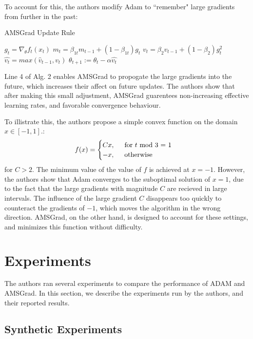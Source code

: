 \documentclass[letterpaper, 10 pt, conference]{ieeeconf}  %
\begin{document}
To account for this, the authors modify Adam to ``remember" large gradients from further in the past:

\begin{algorithm}
\caption{AMSGrad Update Rule}\label{Adam-update}
\begin{algorithmic}[1]
\State $g_t = \nabla_{\theta}f_t(x_t)$
\State $m_t = \beta_{1t}m_{t-1} + (1 - \beta_{1t})g_t$ 
\State $v_t = \beta_2{v_{t-1}} + (1-\beta_2)g_t^2$
\State $\hat{v_t} = max(\hat{v}_{t-1}, v_t)$
\State $\theta_{t + 1} := \theta_t - \alpha{\hat{v_t}}$
\end{algorithmic}
\end{algorithm}

Line 4 of Alg. 2 enables AMSGrad to propogate the large gradients into the future, which increases their affect on future updates. The authors show that after making this small adjustment, AMSGrad guarentees non-increasing effective learning rates, and favorable convergence behaviour.

To illistrate this, the authors propose a simple convex function on the domain $x \in [-1,1]$.:
\[
    f(x) = 
    \begin{cases}
     	Cx, \hspace{5mm} \text{for } t \text{ mod 3 = 1} \\
        -x, \hspace{5mm} \text{otherwise}
    \end{cases}
\]
for $C>2$. The minimum value of  the value of $f$ is achieved at $x=-1$. However, the authors show that Adam converges to the suboptimal solution of $x = 1$, due to the fact that the large gradients with magnitude $C$ are recieved in large intervals. The influence of the large gradient $C$ disappears too quickly to counteract the gradients of $-1$, which moves the algorithm in the wrong direction. AMSGrad, on the other hand, is designed to account for these settings, and minimizes this function without difficulty.

\section{Experiments}


The authors ran several experiments to compare the performance of ADAM and AMSGrad. In this section, we 
describe the experiments run by the authors, and their reported results. 

\subsection{Synthetic Experiments}
\end{document}
